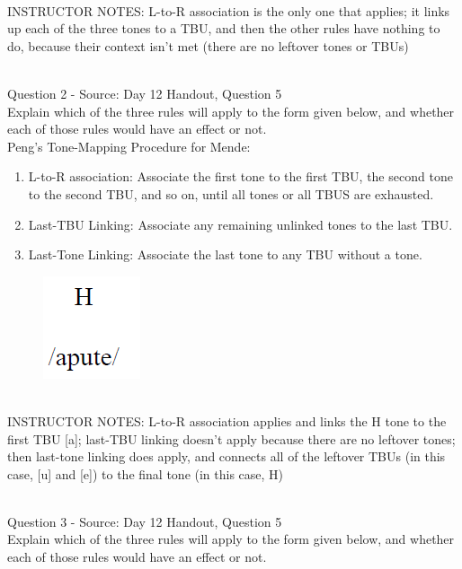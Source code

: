 \documentclass[12pt]{article}
\begin{document}
~\\
INSTRUCTOR NOTES: L-to-R association is the only one that applies; it links up each of the three tones to a TBU, and then the other rules have nothing to do, because their context isn't met (there are no leftover tones or TBUs)


~\\

{\large Question 2} - Source: Day 12 Handout, Question 5\\

Explain which of the three rules will apply to the form given below, and whether each of those rules would have an effect or not.\\

Peng’s Tone-Mapping Procedure for Mende: \begin{enumerate} \item L-to-R association: Associate the first tone to the first TBU, the second tone to the second TBU, and so on, until all tones or all TBUS are exhausted. \item Last-TBU Linking: Associate any remaining unlinked tones to the last TBU. \item Last-Tone Linking: Associate the last tone to any TBU without a tone. \end{enumerate}

\begin{figure}[H]
\includegraphics{../images/mendetone_b.png}
\end{figure}

~\\
INSTRUCTOR NOTES: L-to-R association applies and links the H tone to the first TBU [a]; last-TBU linking doesn't apply because there are no leftover tones; then last-tone linking does apply, and connects all of the leftover TBUs (in this case, [u] and [e]) to the final tone (in this case, H)


~\\

{\large Question 3} - Source: Day 12 Handout, Question 5\\

Explain which of the three rules will apply to the form given below, and whether each of those rules would have an effect or not.\\
\end{document}
